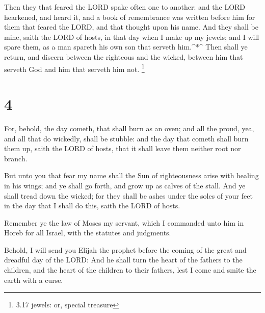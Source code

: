  Then they that feared the LORD spake often one to another:
and the LORD hearkened, and heard it, and a book of remembrance was
written before him for them that feared the LORD, and that thought upon
his name.  And they shall be mine, saith the LORD of hosts,
in that day when I make up my jewels; and I will spare them, as a man
spareth his own son that serveth him.\^{}*\^{}  Then shall
ye return, and discern between the righteous and the wicked, between him
that serveth God and him that serveth him not. \footnote{3.17 jewels:
  or, special treasure}

\hypertarget{section-3}{%
\section{4}\label{section-3}}

 For, behold, the day cometh, that shall burn as an oven;
and all the proud, yea, and all that do wickedly, shall be stubble: and
the day that cometh shall burn them up, saith the LORD of hosts, that it
shall leave them neither root nor branch.

 But unto you that fear my name shall the Sun of
righteousness arise with healing in his wings; and ye shall go forth,
and grow up as calves of the stall.  And ye shall tread down
the wicked; for they shall be ashes under the soles of your feet in the
day that I shall do this, saith the LORD of hosts.

 Remember ye the law of Moses my servant, which I commanded
unto him in Horeb for all Israel, with the statutes and judgments.

 Behold, I will send you Elijah the prophet before the
coming of the great and dreadful day of the LORD:  And he
shall turn the heart of the fathers to the children, and the heart of
the children to their fathers, lest I come and smite the earth with a
curse.
